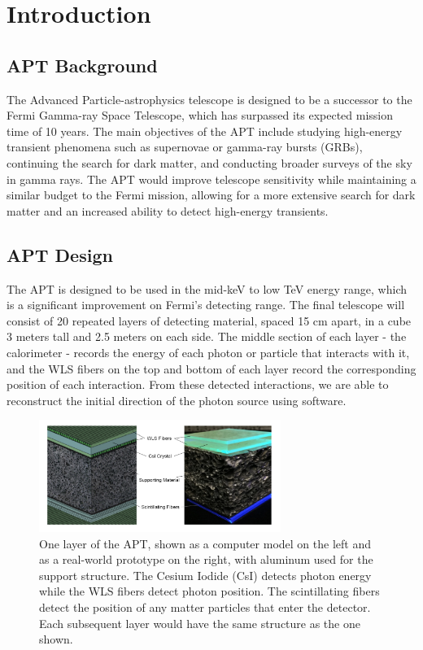 \chapter{Introduction}
\label{cpt:format}


\section{APT Background}

The Advanced Particle-astrophysics telescope is designed to be a successor to the Fermi Gamma-ray Space Telescope, which has surpassed its expected mission time of 10 years. The main objectives of the APT include studying high-energy transient phenomena such as supernovae or gamma-ray bursts (GRBs), continuing the search for dark matter, and conducting broader surveys of the sky in gamma rays. The APT would improve telescope sensitivity while maintaining a similar budget to the Fermi mission, allowing for a more extensive search for dark matter and an increased ability to detect high-energy transients.

\section{APT Design}

The APT is designed to be used in the mid-keV to low TeV energy range, which is a significant improvement on Fermi's detecting range. The final telescope will consist of 20 repeated layers of detecting material, spaced 15 cm apart, in a cube 3 meters tall and 2.5 meters on each side. The middle section of each layer - the calorimeter - records the energy of each photon or particle that interacts with it, and the WLS fibers on the top and bottom of each layer record the corresponding position of each interaction. From these detected interactions, we are able to reconstruct the initial direction of the photon source using software.

\begin{figure}
    \centering
    \includegraphics[width=0.7\textwidth]{APT_layers.png}
    \caption{One layer of the APT, shown as a computer model on the left and as a real-world prototype on the right, with aluminum used for the support structure. The Cesium Iodide (CsI) detects photon energy while the WLS fibers detect photon position. The scintillating fibers detect the position of any matter particles that enter the detector. Each subsequent layer would have the same structure as the one shown. \cite{APTmemo}}
    \label{fig:APT_layer}
\end{figure}

